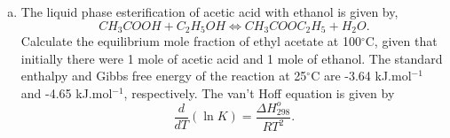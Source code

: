 \documentclass[calculator,steamtables,allquestions,datasheet]{exam_newMarcus2}
\newcommand{\frc}{\displaystyle\frac}
\begin{document}
\begin{question}
\begin{enumerate}[(a)]
\item\label{LectExample} The liquid phase esterification of acetic acid with ethanol is given by,
\begin{displaymath}
CH_{3}COOH + C_{2}H_{5}OH  \Longleftrightarrow  CH_{3}COOC_{2}H_{5} + H_{2}O.
\end{displaymath}
Calculate the equilibrium mole fraction of ethyl acetate at 100$^{\circ}$C, given that initially there were 1 mole of acetic acid and 1 mole of ethanol. The standard enthalpy and Gibbs free energy of the reaction at 25$^{\circ}$C are -3.64 kJ.mol$^{-1}$ and -4.65 kJ.mol$^{-1}$, respectively. The van't Hoff equation is given by~
\begin{displaymath}
\frc{d}{dT}\left(\ln{K}\right) = \frc{\Delta H_{298}^{o}}{RT^{2}}.
\end{displaymath}


\end{enumerate}
\end{question}
\end{document}
